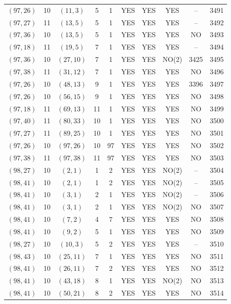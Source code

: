 \begin{longtable}{|c|c|c|c|c|c|c|c|c|c|}
$(97, 26)$ & 10 & $(11, 3)$ & 5 & 1 & YES & YES & YES & -- & 3491\\
$(97, 27)$ & 11 & $(13, 5)$ & 5 & 1 & YES & YES & YES & -- & 3492\\
$(97, 36)$ & 10 & $(13, 5)$ & 5 & 1 & YES & YES & YES & NO & 3493\\
$(97, 18)$ & 11 & $(19, 5)$ & 7 & 1 & YES & YES & YES & -- & 3494\\
$(97, 36)$ & 10 & $(27, 10)$ & 7 & 1 & YES & YES & NO(2) & 3425 & 3495\\
$(97, 38)$ & 11 & $(31, 12)$ & 7 & 1 & YES & YES & YES & NO & 3496\\
$(97, 26)$ & 10 & $(48, 13)$ & 9 & 1 & YES & YES & YES & 3396 & 3497\\
$(97, 26)$ & 10 & $(56, 15)$ & 9 & 1 & YES & YES & YES & NO & 3498\\
$(97, 18)$ & 11 & $(69, 13)$ & 11 & 1 & YES & YES & YES & NO & 3499\\
$(97, 40)$ & 11 & $(80, 33)$ & 10 & 1 & YES & YES & YES & NO & 3500\\
$(97, 27)$ & 11 & $(89, 25)$ & 10 & 1 & YES & YES & YES & NO & 3501\\
$(97, 26)$ & 10 & $(97, 26)$ & 10 & 97 & YES & YES & YES & NO & 3502\\
$(97, 38)$ & 11 & $(97, 38)$ & 11 & 97 & YES & YES & YES & NO & 3503\\
$(98, 27)$ & 10 & $(2, 1)$ & 1 & 2 & YES & YES & NO(2) & -- & 3504\\
$(98, 41)$ & 10 & $(2, 1)$ & 1 & 2 & YES & YES & NO(2) & -- & 3505\\
$(98, 41)$ & 10 & $(3, 1)$ & 2 & 1 & YES & YES & NO(2) & -- & 3506\\
$(98, 41)$ & 10 & $(3, 1)$ & 2 & 1 & YES & YES & NO(2) & NO & 3507\\
$(98, 41)$ & 10 & $(7, 2)$ & 4 & 7 & YES & YES & YES & NO & 3508\\
$(98, 41)$ & 10 & $(9, 2)$ & 5 & 1 & YES & YES & YES & NO & 3509\\
$(98, 27)$ & 10 & $(10, 3)$ & 5 & 2 & YES & YES & YES & -- & 3510\\
$(98, 43)$ & 10 & $(25, 11)$ & 7 & 1 & YES & YES & YES & NO & 3511\\
$(98, 41)$ & 10 & $(26, 11)$ & 7 & 2 & YES & YES & YES & NO & 3512\\
$(98, 41)$ & 10 & $(43, 18)$ & 8 & 1 & YES & YES & NO(2) & NO & 3513\\
$(98, 41)$ & 10 & $(50, 21)$ & 8 & 2 & YES & YES & YES & NO & 3514\\

\end{longtable}
